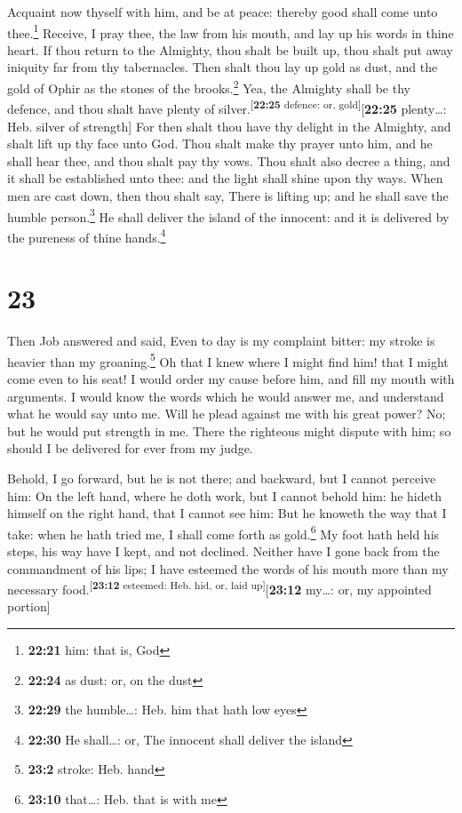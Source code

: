  Acquaint now thyself with him, and be at peace: thereby
good shall come unto thee.\footnote{\textbf{22:21} him: that is, God}
 Receive, I pray thee, the law from his mouth, and lay up
his words in thine heart.  If thou return to the
Almighty, thou shalt be built up, thou shalt put away iniquity far from
thy tabernacles.  Then shalt thou lay up gold as dust,
and the gold of Ophir as the stones of the brooks.\footnote{\textbf{22:24}
  as dust: or, on the dust}  Yea, the Almighty shall be
thy defence, and thou shalt have plenty of
silver.\textsuperscript{{[}\textbf{22:25} defence: or,
gold{]}}{[}\textbf{22:25} plenty\ldots: Heb. silver of strength{]}
 For then shalt thou have thy delight in the Almighty,
and shalt lift up thy face unto God.  Thou shalt make thy
prayer unto him, and he shall hear thee, and thou shalt pay thy vows.
 Thou shalt also decree a thing, and it shall be
established unto thee: and the light shall shine upon thy ways.
 When men are cast down, then thou shalt say, There is
lifting up; and he shall save the humble person.\footnote{\textbf{22:29}
  the humble\ldots: Heb. him that hath low eyes}  He
shall deliver the island of the innocent: and it is delivered by the
pureness of thine hands.\footnote{\textbf{22:30} He shall\ldots: or, The
  innocent shall deliver the island}

\hypertarget{section-22}{%
\section{23}\label{section-22}}

 Then Job answered and said,  Even to day is
my complaint bitter: my stroke is heavier than my groaning.\footnote{\textbf{23:2}
  stroke: Heb. hand}  Oh that I knew where I might find
him! that I might come even to his seat!  I would order my
cause before him, and fill my mouth with arguments.  I
would know the words which he would answer me, and understand what he
would say unto me.  Will he plead against me with his
great power? No; but he would put strength in me.  There
the righteous might dispute with him; so should I be delivered for ever
from my judge.

 Behold, I go forward, but he is not there; and backward,
but I cannot perceive him:  On the left hand, where he
doth work, but I cannot behold him: he hideth himself on the right hand,
that I cannot see him:  But he knoweth the way that I
take: when he hath tried me, I shall come forth as gold.\footnote{\textbf{23:10}
  that\ldots: Heb. that is with me}  My foot hath held
his steps, his way have I kept, and not declined. 
Neither have I gone back from the commandment of his lips; I have
esteemed the words of his mouth more than my necessary
food.\textsuperscript{{[}\textbf{23:12} esteemed: Heb. hid, or, laid
up{]}}{[}\textbf{23:12} my\ldots: or, my appointed portion{]}

